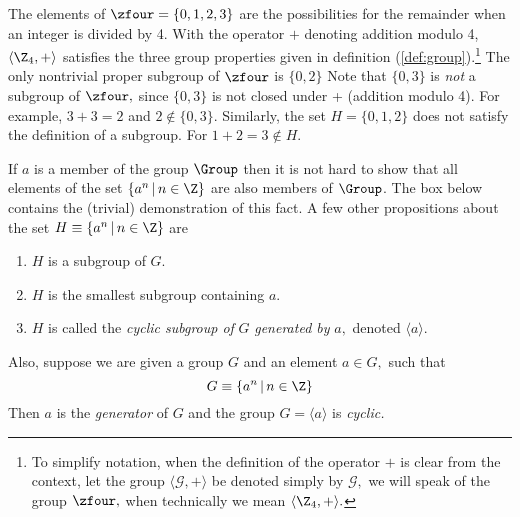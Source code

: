 The elements of $\zfour = \{0, 1, 2, 3\}$ are the possibilities
for the remainder when an integer is divided by 4.  With the operator $+$
denoting addition modulo 4, 
$\langle \Z_4, + \rangle$ 
satisfies the three group properties
given in definition (\ref{def:group}).\footnote{To simplify notation,
when the definition of the operator $+$ is clear from the context, let
the group  $\langle \mathcal{G}, + \rangle$ be denoted simply by
$\mathcal{G},$ \eg we will speak of the group $\zfour,$ when
technically we mean  $\langle \Z_4, + \rangle.$} 
The only nontrivial proper subgroup of 
$\zfour$ %
is $\{0,2\}$  %
Note that
$\{0,3\}$ 
is \emph{not} a subgroup of $\zfour,$ since  $\{0,3\}$ is not closed
under + (addition modulo 4).  For example, $3 + 3 = 2$ and $2 \not\in
\{0,3\}.$  Similarly, the set $H = \{0,1,2\}$ does not satisfy the
definition of a subgroup. For $1 + 2 = 3 \not\in H$.  

If $a$ is a member of the group $\Group$ 
then it is not hard to show that all elements of the set 
$\{a^n \,|\, n \in \Z\}$ are also members of $\Group$.
The box below contains the (trivial) demonstration of this fact.
A few other propositions about the set $H \equiv \{a^n \,|\, n \in \Z\}$
are  
\begin{enumerate}
\item $H$ is a subgroup of $G.$  
\item $H$ is the smallest subgroup containing $a.$
\item $H$ is called the \emph{cyclic subgroup of} $G$ \emph{generated by}
  $a,$ denoted 
$\langle a \rangle.$
\end{enumerate}
Also, suppose we are given a group $G$ and an element $a \in G,$ such
that 
\[ G \equiv \{a^n \,|\, n \in \Z\}\]
Then $a$ is the \emph{generator} of $G$ and the group 
$G = \langle a \rangle$ is \emph{cyclic.} 

